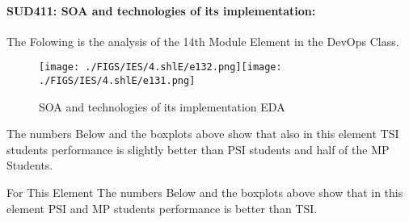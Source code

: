 \documentclass[12pt]{extreport}
\begin{document}

\paragraph{\large SUD411: SOA and technologies of its implementation:\\
} 
The Folowing is the analysis of the 14th Module Element in the DevOps Class.

\begin{figure}[H]
	\centering
	\texttt{[image: ./FIGS/IES/4.shlE/e132.png]}\texttt{[image: ./FIGS/IES/4.shlE/e131.png]}
	\caption{SOA and technologies of its implementation EDA}
	\label{fig:56}
\end{figure}

The numbers Below and the boxplots above show that also in this element  TSI students performance is slightly better than PSI students and half of the MP Students.

For This Element The numbers Below and the boxplots above show that in this element  PSI and MP students performance is  better than TSI.
\end{document}
